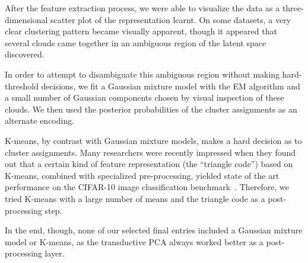 
After the feature extraction process, we were able to visualize the data as a
three-dimensional scatter plot of the representation learnt. On some datasets,
a very clear clustering pattern became visually apparent, though it appeared
that several clouds came together in an ambiguous region of the latent space
discovered.

In order to attempt to disambiguate this ambiguous region without
making hard-threshold decisions, we fit a Gaussian mixture model with the EM
algorithm and a small number of Gaussian components chosen by visual inspection
of these clouds.  We then used the posterior probabilities of the cluster
assignments as an alternate encoding. 

K-means, by contrast with Gaussian mixture models, makes a hard decision as
to cluster assignments. Many researchers were recently impressed when they found out
that a certain kind of feature representation (the ``triangle code'') based on
K-means, combined with specialized pre-processing, yielded state of the art
performance on the CIFAR-10 image classification benchmark~\citep{Coates2011}.
Therefore, we tried K-means with a large number of means and the triangle code as
a post-processing step.

In the end, though, none of our selected final entries included a Gaussian mixture model or K-means,
as the transductive PCA always worked better as a post-processing layer.



